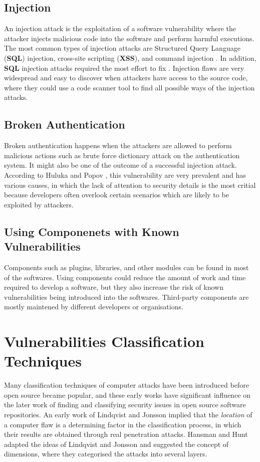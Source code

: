 \documentclass[12pt, a4paper]{report}
\begin{document}
\subsection{Injection}
An injection attack is the exploitation of a software vulnerability where the attacker injects
malicious code into the software and perform harmful executions. The most common types of injection
attacks are Structured Query Language (\textbf{SQL}) injection, cross-site scripting (\textbf{XSS}),
and command injection \cite{pietraszek_2006}. In addition, \textbf{SQL} injection attacks
required the most effort to fix \cite{othmane_2015}. Injection flaws are very widespread and easy to
discover when attackers have access to the source code, where they could use a code scanner tool to
find all possible ways of the injection attacks.

\subsection{Broken Authentication}
Broken authentication happens when the attackers are allowed to perform malicious actions such as
brute force dictionary attack on the authentication system. It might also be one of the outcome of a
successful injection attack. According to Huluka and Popov \cite{huluka_2012}, this vulnerability
are very prevalent and has various causes, in which the lack of attention to security details is the
most critial because developers often overlook certain scenarios which are likely to be exploited by
attackers.

\subsection{Using Componenets with Known Vulnerabilities}
Components such as plugins, libraries, and other modules can be found in most of the softwares.
Using components could reduce the amount of work and time required to develop a software, but they
also increase the risk of known vulnerabilities being introduced into the softwares. Third-party
components are mostly maintened by different developers or organisations.

\section{Vulnerabilities Classification Techniques}
Many classification techniques of computer attacks have been introduced before open source became
popular, and these early works have significant influence on the later work of finding and
classifying security issues in open source software repositories. An early work of Lindqvist and
Jonsson \cite{lindqvist_1999} implied that the \textit{location} of a computer flaw is a determining
factor in the classification process, in which their results are obtained through real penetration
attacks. Hansman and Hunt \cite{hansman_2005} adapted the ideas of Lindqvist and Jonsson and
suggested the concept of dimensions, where they categorised the attacks into several layers.
\end{document}
